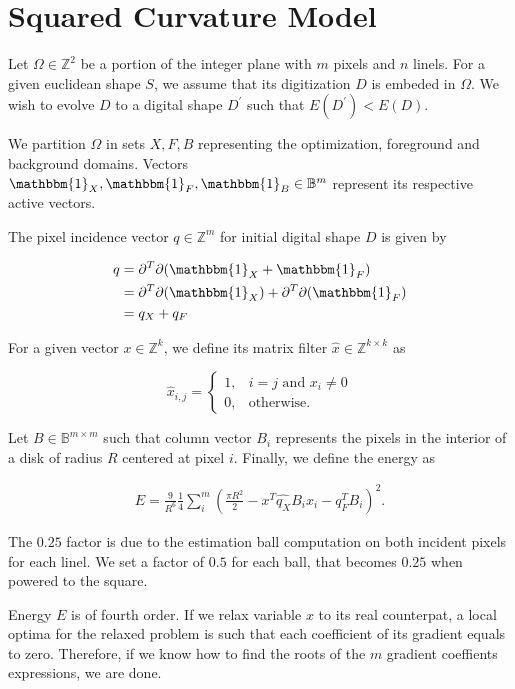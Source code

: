 \section{Squared Curvature Model}

Let $\Omega \in \mathbb{Z}^2$ be a portion of the integer plane with $m$ pixels and $n$ linels. For a given euclidean shape $S$, we assume that its digitization $D$ is embeded in $\Omega$. We wish to evolve $D$ to a digital shape $D^\prime$ such that $E(D^\prime) < E(D)$.

We partition $\Omega$ in sets $X,F,B$ representing the optimization, foreground and background domains. Vectors $\mathbbm{1}_X, \mathbbm{1}_F, \mathbbm{1}_B \in \mathbb{B}^m$ represent its respective active vectors.

\begin{example}
	The pixel incidence vector $q \in \mathbb{Z}^m$ for initial digital shape $D$ is given by
	
	\begin{align*}
		q &= \partial^T\partial (\mathbbm{1}_X + \mathbbm{1}_F)\\
		&=\partial^T\partial (\mathbbm{1}_X) + \partial^T\partial (\mathbbm{1}_F)\\ 
		&= q_X + q_F
	\end{align*}
\end{example}

For a given vector $x \in \mathbb{Z}^k$, we define its matrix filter $\hat{x} \in \mathbb{Z}^{k\times k}$ as

\[
	\hat{x}_{i,j} = \left\{ \begin{array}{ll}
	1, & i=j \text{ and } x_i \neq 0 \\
	0, & \text{otherwise}.
	\end{array}\right.
\]

Let $B \in \mathbb{B}^{m\times m}$ such that column vector $B_i$ represents the pixels in the interior of a disk of radius $R$ centered at pixel $i$. Finally, we define the energy as

\begin{align*}
	E = \frac{9}{R^6}\frac{1}{4}\sum_{i}^{m}{\left( \frac{\pi R^2}{2} - x^T\hat{q_X}B_ix_i - q_F^TB_i \right)^2}.
\end{align*}

The $0.25$ factor is due to the estimation ball computation on both incident pixels for each linel. We set a factor of $0.5$ for each ball, that becomes $0.25$ when powered to the square. 

Energy $E$ is of fourth order. If we relax variable $x$ to its real counterpat, a local optima for the relaxed problem is such that each coefficient of its gradient equals to zero. Therefore, if we know how to find the roots of the $m$ gradient coeffients expressions, we are done.

